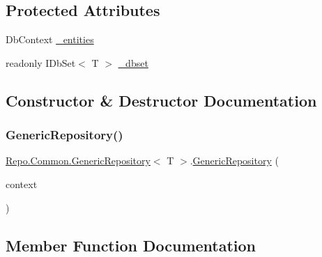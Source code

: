 \subsection*{Protected Attributes}
\begin{DoxyCompactItemize}
\item 
Db\+Context \hyperlink{class_repo_1_1_common_1_1_generic_repository_a24c97c27d80ffec6a2c058a183b5941e}{\+\_\+entities}
\item 
readonly I\+Db\+Set$<$ T $>$ \hyperlink{class_repo_1_1_common_1_1_generic_repository_a921e230c30c21f3adeb8f7ffd6345149}{\+\_\+dbset}
\end{DoxyCompactItemize}


\subsection{Constructor \& Destructor Documentation}
\mbox{\label{class_repo_1_1_common_1_1_generic_repository_a6ad38e9dd280fddbbf25be2e8e1bd88a}} 
\subsubsection{\texorpdfstring{Generic\+Repository()}{GenericRepository()}}
{\footnotesize\ttfamily \hyperlink{class_repo_1_1_common_1_1_generic_repository}{Repo.\+Common.\+Generic\+Repository}$<$ T $>$.\hyperlink{class_repo_1_1_common_1_1_generic_repository}{Generic\+Repository} (\begin{DoxyParamCaption}\item[{Db\+Context}]{context }\end{DoxyParamCaption})}



\subsection{Member Function Documentation}
\mbox{\label{class_repo_1_1_common_1_1_generic_repository_a2370df477136ac65eacb282af1d00a9c}} 
